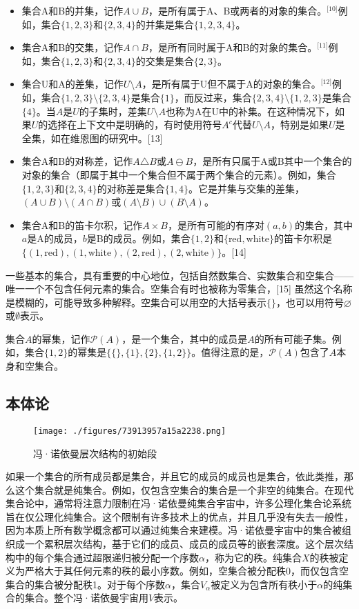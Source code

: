 \begin{itemize}
\item 集合A和B的并集，记作$A \cup B$，是所有属于A、B或两者的对象的集合。\(^\text{[10]}\)例如，集合$\{1, 2, 3\}$和$\{2, 3, 4\}$的并集是集合$\{1, 2, 3, 4\}$。
\item 集合A和B的交集，记作$A \cap B$，是所有同时属于A和B的对象的集合。\(^\text{[11]}\)例如，集合$\{1, 2, 3\}$和$\{2, 3, 4\}$的交集是集合$\{2, 3\}$。
\item 集合U和A的差集，记作$U \setminus A$，是所有属于U但不属于A的对象的集合。\(^\text{[12]}\)例如，集合$\{1, 2, 3\} \setminus \{2, 3, 4\}$是集合$\{1\}$，而反过来，集合$\{2, 3, 4\} \setminus \{1, 2, 3\}$是集合$\{4\}$。当$A$是$U$的子集时，差集$U \setminus A$也称为A在U中的补集。在这种情况下，如果$U$的选择在上下文中是明确的，有时使用符号$A^c$代替$U \setminus A$，特别是如果$U$是全集，如在维恩图的研究中。[13]
\item 集合A和B的对称差，记作$A \triangle B$或$A \ominus B$，是所有只属于A或B其中一个集合的对象的集合（即属于其中一个集合但不属于两个集合的元素）。例如，集合$\{1, 2, 3\}$和$\{2, 3, 4\}$的对称差是集合$\{1, 4\}$。它是并集与交集的差集，$(A \cup B) \setminus (A \cap B)$或$(A \setminus B) \cup (B \setminus A)$。
\item 集合A和B的笛卡尔积，记作$A \times B$，是所有可能的有序对$(a, b)$的集合，其中$a$是A的成员，$b$是B的成员。例如，集合$\{1, 2\}$和$\{\text{red}, \text{white}\}$的笛卡尔积是$\{(1, \text{red}), (1, \text{white}), (2, \text{red}), (2, \text{white})\}$。[14]
\end{itemize}
一些基本的集合，具有重要的中心地位，包括自然数集合、实数集合和空集合——唯一一个不包含任何元素的集合。空集合有时也被称为零集合，[15] 虽然这个名称是模糊的，可能导致多种解释。空集合可以用空的大括号表示$\{\}$，也可以用符号$\varnothing$或$\emptyset$表示。

集合$A$的幂集，记作${\mathcal {P}}(A)$，是一个集合，其中的成员是$A$的所有可能子集。例如，集合$\{1, 2\}$的幂集是$\{\{\}, \{1\}, \{2\}, \{1, 2\}\}$。值得注意的是，${\mathcal {P}}(A)$包含了$A$本身和空集合。
\subsection{本体论}
\begin{figure}[ht]
\centering
\texttt{[image: ./figures/73913957a15a2238.png]}
\caption{冯·诺依曼层次结构的初始段} \label{fig_Set1_6}
\end{figure}
如果一个集合的所有成员都是集合，并且它的成员的成员也是集合，依此类推，那么这个集合就是纯集合。例如，仅包含空集合的集合是一个非空的纯集合。在现代集合论中，通常将注意力限制在冯·诺依曼纯集合宇宙中，许多公理化集合论系统旨在仅公理化纯集合。这个限制有许多技术上的优点，并且几乎没有失去一般性，因为本质上所有数学概念都可以通过纯集合来建模。冯·诺依曼宇宙中的集合被组织成一个累积层次结构，基于它们的成员、成员的成员等的嵌套深度。这个层次结构中的每个集合通过超限递归被分配一个序数$\alpha$，称为它的秩。纯集合$X$的秩被定义为严格大于其任何元素的秩的最小序数。例如，空集合被分配秩0，而仅包含空集合的集合被分配秩1。对于每个序数$\alpha$，集合$V_{\alpha}$被定义为包含所有秩小于$\alpha$的纯集合的集合。整个冯·诺依曼宇宙用$V$表示。
